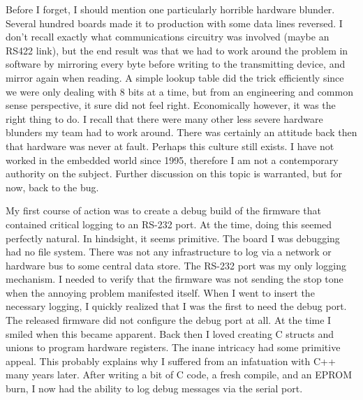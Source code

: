 Before I forget, I should mention one particularly horrible hardware blunder. Several hundred boards made it to production with some data lines reversed. I don't recall exactly what communications circuitry was involved (maybe an RS422 link), but the end result was that we had to work around the problem in software by mirroring every byte before writing to the transmitting device, and mirror again when reading. A simple lookup table did the trick efficiently since we were only dealing with 8 bits at a time, but from an engineering and common sense perspective, it sure did not feel right. Economically however, it was the right thing to do. I recall that there were many other less severe hardware blunders my team had to work around. There was certainly an attitude back then that hardware was never at fault. Perhaps this culture still exists. I have not worked in the embedded world since 1995, therefore I am not a contemporary authority on the subject. Further discussion on this topic is warranted, but for now, back to the bug.

My first course of action was to create a debug build of the firmware that contained critical logging to an RS-232 port. At the time, doing this seemed perfectly natural. In hindsight, it seems primitive. The board I was debugging had no file system. There was not any infrastructure to log via a network or hardware bus to some central data store. The RS-232 port was my only logging mechanism. I needed to verify that the firmware was not sending the stop tone when the annoying problem manifested itself. When I went to insert the necessary logging, I quickly realized that I was the first to need the debug port. The released firmware did not configure the debug port at all. At the time I smiled when this became apparent. Back then I loved creating C structs and unions to program hardware registers. The inane intricacy had some primitive appeal. This probably explains why I suffered from an infatuation with C++ many years later. After writing a bit of C code, a fresh compile, and an EPROM burn, I now had the ability to log debug messages via the serial port.

